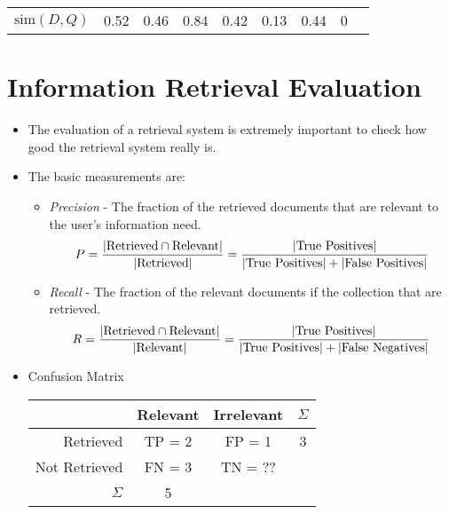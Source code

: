 \begin{table}[H]
\begin{tabular}{|l|c|c|c|c|c|c|c||c|}
					\( \text{sim}(D, Q) \) & 0.52                                    & 0.46                                     & 0.84                                              & 0.42                                & 0.13                                        & 0.44                                              & 0                                      & \multicolumn{1}{c}{}  \\ \cline{1-8}
				\end{tabular}
			\end{table}

	\section{Information Retrieval Evaluation} %
		\begin{itemize}
			\item The evaluation of a retrieval system is extremely important to check how good the retrieval system really is.
			\item The basic measurements are:
				\begin{itemize}
					\item \textit{Precision} - The fraction of the retrieved documents that are relevant to the user's information need.
						\begin{equation*}
							P = \frac{\abs{\text{Retrieved} \cap \text{Relevant}}}{\abs{\text{Retrieved}}} = \frac{\abs{\text{True Positives}}}{\abs{\text{True Positives}} + \abs{\text{False Positives}}}
						\end{equation*}
					\item \textit{Recall} - The fraction of the relevant documents if the collection that are retrieved.
						\begin{equation*}
							R = \frac{\abs{\text{Retrieved} \cap \text{Relevant}}}{\abs{\text{Relevant}}} = \frac{\abs{\text{True Positives}}}{\abs{\text{True Positives}} + \abs{\text{False Negatives}}}
						\end{equation*}
				\end{itemize}
			\item Confusion Matrix
				\begin{table}[H]
					\centering
					\begin{tabular}{r | c | c | c}
						              & Relevant & Irrelevant & \( \Sigma \) \\ \hline
						Retrieved     & TP = 2   & FP = 1     & 3            \\ \hline
						Not Retrieved & FN = 3   & TN = ??    &              \\ \hline
						\(\Sigma\)    & 5        &            &
					\end{tabular}
				\end{table}
		\end{itemize}

